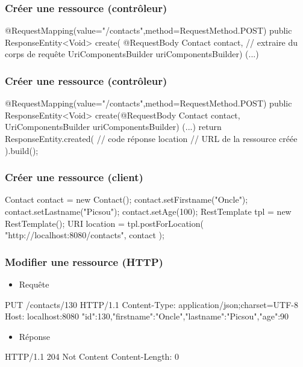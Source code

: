 \begin{frame}[fragile]
 \frametitle{Créer une ressource (contrôleur)}

 \begin{javacode}
@RequestMapping(value="/contacts",method=RequestMethod.POST)
public ResponseEntity<Void> create(
      @RequestBody Contact contact,  // extraire du corps de requ\^ete
      UriComponentsBuilder uriComponentsBuilder) {
  (...)
}
 \end{javacode}

\end{frame}

\begin{frame}[fragile]
 \frametitle{Créer une ressource (contrôleur)}

 \begin{javacode}
@RequestMapping(value="/contacts",method=RequestMethod.POST)
public ResponseEntity<Void> create(@RequestBody Contact contact,
                          UriComponentsBuilder uriComponentsBuilder) {
  (...)
 	return ResponseEntity.created(     // code r\'eponse
    location                         // URL de la ressource cr\'e\'ee
  ).build();
}
 \end{javacode}

\end{frame}

\begin{frame}[fragile]
 \frametitle{Créer une ressource (client)}

 \begin{javacode}
Contact contact = new Contact();
contact.setFirstname("Oncle");
contact.setLastname("Picsou");
contact.setAge(100);
RestTemplate tpl = new RestTemplate();
URI location = tpl.postForLocation(
  "http://localhost:8080/contacts",
  contact
);
 \end{javacode}

\end{frame}

\begin{frame}[fragile]
 \frametitle{Modifier une ressource (HTTP)}

 \begin{itemize}
  \item Requête
 \end{itemize}

 \begin{textcode}
PUT /contacts/130 HTTP/1.1
Content-Type: application/json;charset=UTF-8
Host: localhost:8080
{"id":130,"firstname":"Oncle","lastname":"Picsou","age":90}
 \end{textcode}

  \begin{itemize}
  \item Réponse
 \end{itemize}

 \begin{textcode}
HTTP/1.1 204 Not Content
Content-Length: 0
 \end{textcode}

\end{frame}

